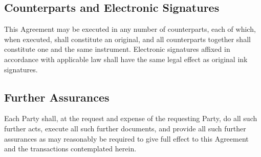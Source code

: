 \subsection{Counterparts and Electronic Signatures}

This Agreement may be executed in any number of counterparts, each of which,
when executed, shall constitute an original, and all counterparts together shall
constitute one and the same instrument.  Electronic signatures affixed in
accordance with applicable law shall have the same legal effect as original ink
signatures.

\subsection{Further Assurances}

Each Party shall, at the request and expense of the requesting Party, do all
such further acts, execute all such further documents, and provide all such
further assurances as may reasonably be required to give full effect to this
Agreement and the transactions contemplated herein.
